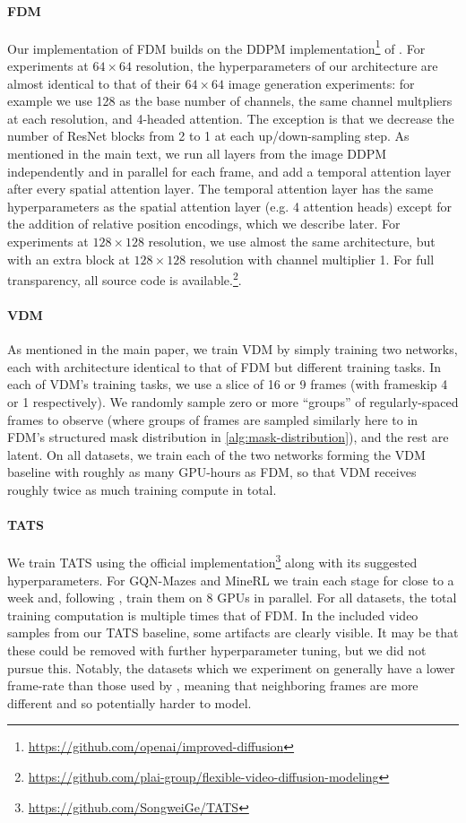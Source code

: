 \paragraph{FDM} 
Our implementation of FDM builds on the DDPM implementation\footnote{\url{https://github.com/openai/improved-diffusion}} of \citet{nichol2021improved}. For experiments at $64\times64$ resolution, the hyperparameters of our architecture are almost identical to that of their $64\times64$ image generation experiments: for example we use 128 as the base number of channels, the same channel multpliers at each resolution, and 4-headed attention. The exception is that we decrease the number of ResNet blocks from 2 to 1 at each up/down-sampling step. As mentioned in the main text, we run all layers from the image DDPM independently and in parallel for each frame, and add a temporal attention layer after every spatial attention layer. The temporal attention layer has the same hyperparameters as the spatial attention layer (e.g. 4 attention heads) except for the addition of relative position encodings, which we describe later. For experiments at $128\times128$ resolution, we use almost the same architecture, but with an extra block at $128\times128$ resolution with channel multiplier 1.  For full transparency, all source code is available.\footnote{\url{https://github.com/plai-group/flexible-video-diffusion-modeling}}.

\paragraph{VDM}
As mentioned in the main paper, we train VDM by simply training two networks, each with architecture identical to that of FDM but different training tasks. In each of VDM's training tasks, we use a slice of 16 or 9 frames (with frameskip 4 or 1 respectively). We randomly sample zero or more ``groups'' of regularly-spaced frames to observe (where groups of frames are sampled similarly here to in FDM's structured mask distribution in \cref{alg:mask-distribution}), and the rest are latent. On all datasets, we train each of the two networks forming the VDM baseline with roughly as many GPU-hours as FDM, so that VDM receives roughly twice as much training compute in total.

\paragraph{TATS}
We train TATS using the official implementation\footnote{\url{https://github.com/SongweiGe/TATS}} along with its suggested hyperparameters. For GQN-Mazes and MineRL we train each stage for close to a week and, following \citet{ge2022long}, train them on 8 GPUs in parallel. For all datasets, the total training computation is multiple times that of FDM. In the included video samples from our TATS baseline, some artifacts are clearly visible. It may be that these could be removed with further hyperparameter tuning, but we did not pursue this. Notably, the datasets which we experiment on generally have a lower frame-rate than those used by \citet{ge2022long}, meaning that neighboring frames are more different and so potentially harder to model.

